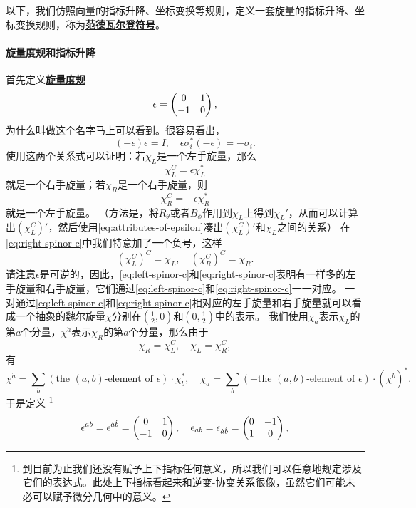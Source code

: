 \documentclass[hyperref, UTF8, a4paper]{ctexart}
\newcommand{\concept}[1]{\underline{\textbf{#1}}}
\begin{document}
以下，我们仿照向量的指标升降、坐标变换等规则，定义一套旋量的指标升降、坐标变换规则，称为\concept{范德瓦尔登符号}。

\paragraph{旋量度规和指标升降} 首先定义\concept{旋量度规}
\begin{equation}
    \epsilon = \pmqty{0 & 1 \\ -1 & 0},
\end{equation}
为什么叫做这个名字马上可以看到。很容易看出，
\begin{equation}
    (-\epsilon) \epsilon = I, \quad \epsilon \sigma_i^* (-\epsilon) = - \sigma_i. 
    \label{eq:attributes-of-epsilon}
\end{equation}
使用这两个关系式可以证明：若$\chi_L$是一个左手旋量，那么
\begin{equation}
    \chi_L^C = \epsilon\chi_L^*
    \label{eq:left-spinor-c}
\end{equation}
就是一个右手旋量；若$\chi_R$是一个右手旋量，则
\begin{equation}
    \chi_R^C = -\epsilon \chi_R^*
    \label{eq:right-spinor-c}
\end{equation}
就是一个左手旋量。
（方法是，将$R_\theta$或者$B_\phi$作用到$\chi_L$上得到$\chi_L'$，从而可以计算出$(\chi_L^C)'$，然后使用\eqref{eq:attributes-of-epsilon}凑出$(\chi_L^C)'$和$\chi_L$之间的关系）
在\eqref{eq:right-spinor-c}中我们特意加了一个负号，这样
\[
    (\chi_L^C)^C = \chi_L, \quad (\chi_R^C)^C = \chi_R.
\]
请注意$\epsilon$是可逆的，因此，\eqref{eq:left-spinor-c}和\eqref{eq:right-spinor-c}表明有一样多的左手旋量和右手旋量，它们通过\eqref{eq:left-spinor-c}和\eqref{eq:right-spinor-c}一一对应。
一对通过\eqref{eq:left-spinor-c}和\eqref{eq:right-spinor-c}相对应的左手旋量和右手旋量就可以看成一个抽象的魏尔旋量$\chi$分别在$(\frac{1}{2},0)$和$(0, \frac{1}{2})$中的表示。
我们使用$\chi_a$表示$\chi_L$的第$a$个分量，$\chi^{\dot{a}}$表示$\chi_R$的第$a$个分量，那么由于
\[
    \chi_R = \chi_L^C, \quad \chi_L = \chi_R^C,
\]
有
\[
    \chi^{\dot{a}} = \sum_b (\text{the $(a,b)$-element of $\epsilon$}) \cdot \chi_b^*, \quad \chi_a = \sum_b ( - \text{the $(a,b)$-element of $\epsilon$}) \cdot (\chi^{\dot{b}})^*.
\]
于是定义%
\footnote{到目前为止我们还没有赋予上下指标任何意义，所以我们可以任意地规定涉及它们的表达式。此处上下指标看起来和逆变-协变关系很像，虽然它们可能未必可以赋予微分几何中的意义。}
\begin{equation}
    \epsilon^{ab} = \epsilon^{\dot{a} \dot{b}} = \pmqty{0 & 1 \\ -1 & 0}, \quad \epsilon_{ab} = \epsilon_{\dot{a} \dot{b}} = \pmqty{0 & -1 \\ 1 & 0},
\end{equation}
\end{document}
